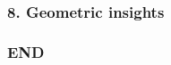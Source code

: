 \documentclass[11pt]{article}
\begin{document}
    \begin{center}
    \end{center}
    { \hspace*{\fill} \\}
    
    \subsubsection{8. Geometric insights}\label{geometric-insights}

\subsubsection{END}\label{end}


    
    
    
    
\end{document}
